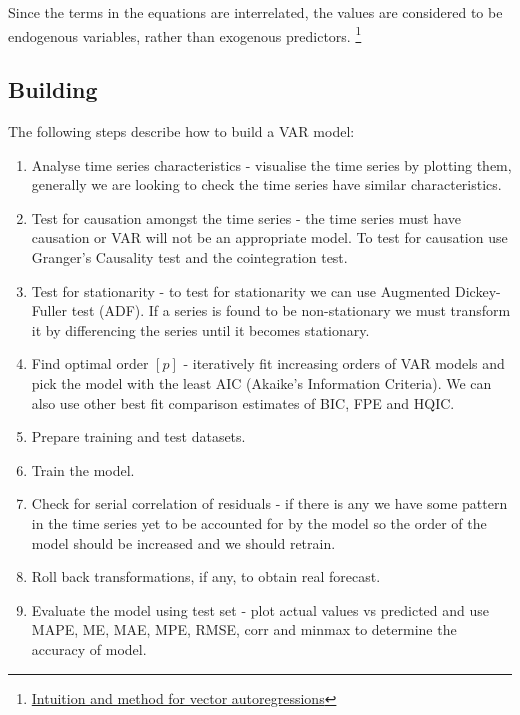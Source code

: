\documentclass[11pt]{article}
\begin{document}
Since the terms in the equations are interrelated, the values are considered to be endogenous variables, rather than exogenous predictors. \footnote[2]{\href{https://www.machinelearningplus.com/time-series/vector-autoregression-examples-python/}{Intuition and method for vector autoregressions}}

\subsection{Building}
The following steps describe how to build a VAR model: \footnotemark[2]

\vspace{-0.25cm}
\begin{enumerate}
	\itemsep-0.2cm
	\item Analyse time series characteristics - visualise the time series by plotting them, generally we are looking to check the time series have similar characteristics.
	\item Test for causation amongst the time series - the time series must have causation or VAR will not be an appropriate model. To test for causation use Granger's Causality test and the cointegration test.
	\item Test for stationarity - to test for stationarity we can use Augmented Dickey-Fuller test (ADF). If a series is found to be non-stationary we must transform it by differencing the series until it becomes stationary.
	\item Find optimal order $[p]$ - iteratively fit increasing orders of VAR models and pick the model with the least AIC (Akaike’s Information Criteria). We can also use other best fit comparison estimates of BIC, FPE and HQIC.
	\item Prepare training and test datasets.
	\item Train the model.
	\item Check for serial correlation of residuals -  if there is any we have some pattern in the time series yet to be accounted for by the model so the order of the model should be increased and we should retrain.
	\item Roll back transformations, if any, to obtain real forecast.
	\item Evaluate the model using test set - plot actual values vs predicted and use MAPE, ME, MAE, MPE, RMSE, corr and minmax to determine the accuracy of model.
\end{enumerate} 
\end{document}
